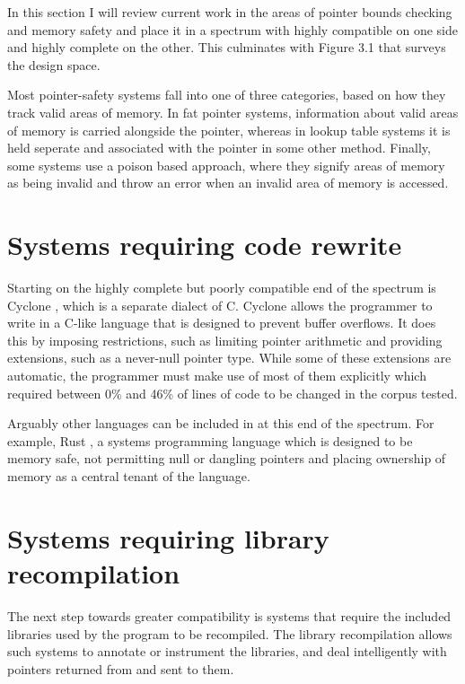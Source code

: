 

In this section I will review current work in the areas of pointer bounds checking and memory safety and place it in a spectrum with highly compatible on one side and highly complete on the other.
This culminates with Figure 3.1 that surveys the design space.

Most pointer-safety systems fall into one of three categories, based on how they track valid areas of memory.
In fat pointer systems, information about valid areas of memory is carried alongside the pointer, whereas in lookup table systems it is held seperate and associated with the pointer in some other method.
Finally, some systems use a poison based approach, where they signify areas of memory as being invalid and throw an error when an invalid area of memory is accessed.

\section{Systems requiring code rewrite}
Starting on the highly complete but poorly compatible end of the spectrum is Cyclone \cite{jim2002cyclone}, which is a separate dialect of C.
Cyclone allows the programmer to write in a C-like language that is designed to prevent buffer overflows.
It does this by imposing restrictions, such as limiting pointer arithmetic and providing extensions, such as a never-null pointer type.
While some of these extensions are automatic, the programmer must make use of most of them explicitly which required between 0\% and 46\% of lines of code to be changed in the corpus tested.

Arguably other languages can be included in at this end of the spectrum. 
For example, Rust \cite{rust}, a systems programming language which is designed to be memory safe, not permitting null or dangling pointers and placing ownership of memory as a central tenant of the language.

\section{Systems requiring library recompilation}

The next step towards greater compatibility is systems that require the included libraries used by the program to be recompiled.
The library recompilation allows such systems to annotate or instrument the libraries, and deal intelligently with pointers returned from and sent to them.

